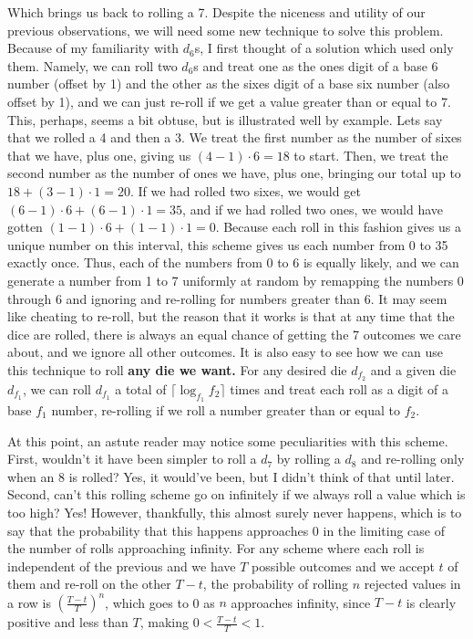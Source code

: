 \documentclass{article}
\begin{document}
\par Which brings us back to rolling a 7.
Despite the niceness and utility of our previous observations, we will need some new technique to solve this problem. 
Because of my familiarity with $d_6$s, I first thought of a solution which used only them.
Namely, we can roll two $d_6$s and treat one as the ones digit of a base 6 number (offset by 1) and the other as the sixes digit of a base six number (also offset by 1), and we can just re-roll if we get a value greater than or equal to 7.
This, perhaps, seems a bit obtuse, but is illustrated well by example.
Lets say that we rolled a 4 and then a 3. 
We treat the first number as the number of sixes that we have, plus one, giving us $(4 - 1) \cdot 6 = 18$ to start.
Then, we treat the second number as the number of ones we have, plus one, bringing our total up to $18 + (3 - 1) \cdot 1 = 20$.
If we had rolled two sixes, we would get $(6 - 1) \cdot 6 + (6 - 1) \cdot 1 = 35$, and if we had rolled two ones, we would have gotten $(1 - 1) \cdot 6 + (1 - 1) \cdot 1 = 0$. 
Because each roll in this fashion gives us a unique number on this interval, this scheme gives us each number from 0 to 35 exactly once.
Thus, each of the numbers from 0 to 6 is equally likely, and we can generate a number from 1 to 7 uniformly at random by remapping the numbers 0 through 6 and ignoring and re-rolling for numbers greater than 6.
It may seem like cheating to re-roll, but the reason that it works is that at any time that the dice are rolled, there is always an equal chance of getting the 7 outcomes we care about, and we ignore all other outcomes.
It is also easy to see how we can use this technique to roll \textbf{any die we want.}
For any desired die $d_{f_2}$ and a given die $d_{f_1}$, we can roll $d_{f_1}$ a total of $\lceil \log_{f_1}{f_2} \rceil$ times and treat each roll as a digit of a base $f_1$ number, re-rolling if we roll a number greater than or equal to $f_2$.

\par At this point, an astute reader may notice some peculiarities with this scheme. 
First, wouldn't it have been simpler to roll a $d_7$ by rolling a $d_8$ and re-rolling only when an 8 is rolled? 
Yes, it would've been, but I didn't think of that until later.
Second, can't this rolling scheme go on infinitely if we always roll a value which is too high?
Yes!
However, thankfully, this almost surely never happens, which is to say that the probability that this happens approaches 0 in the limiting case of the number of rolls approaching infinity.
For any scheme where each roll is independent of the previous and we have $T$ possible outcomes and we accept $t$ of them and re-roll on the other $T - t$, the probability of rolling $n$ rejected values in a row is $\left(\frac{T - t}{T}\right)^n$, which goes to 0 as $n$ approaches infinity, since $T - t$ is clearly positive and less than $T$, making $0 < \frac{T-t}{T} < 1$. 
\end{document}
